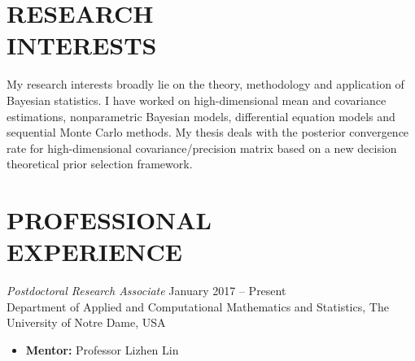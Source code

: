 \documentclass[margin, 10pt]{res} %
\begin{document}
\begin{resume}

 
\section{\sf RESEARCH \\ INTERESTS}
My research interests broadly lie on the theory, methodology and application of Bayesian statistics.
I have worked on high-dimensional mean and covariance estimations, nonparametric Bayesian models, differential equation models and sequential Monte Carlo methods. 
My thesis deals with the posterior convergence rate for high-dimensional covariance/precision matrix based on a new decision theoretical prior selection framework.
\vspace{.2cm}



\section{\sf PROFESSIONAL\\EXPERIENCE}

{\sl Postdoctoral Research Associate} \hfill January 2017 -- Present  \\
Department of Applied and Computational Mathematics and Statistics, The University of Notre Dame, USA  
\begin{itemize} \itemsep -1.0pt %
	\item {\bf Mentor:} Professor Lizhen Lin
\end{itemize}
\vspace{.2cm}



\end{resume}
\end{document}
